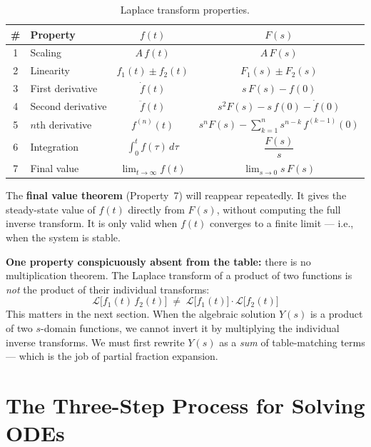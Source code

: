 \documentclass[12pt]{article}
\begin{document}
\begin{table}[htbp]
\centering
\caption{Laplace transform properties.}
\label{tab:theorems}
\begin{tabular}{clcc}
\toprule
\# & Property & $f(t)$ & $F(s)$ \\
\midrule
1 & Scaling      & $A\,f(t)$            & $A\,F(s)$ \\[4pt]
2 & Linearity    & $f_1(t) \pm f_2(t)$  & $F_1(s) \pm F_2(s)$ \\[4pt]
3 & First derivative  & $\dot{f}(t)$   & $s\,F(s) - f(0)$ \\[4pt]
4 & Second derivative & $\ddot{f}(t)$  & $s^2 F(s) - s\,f(0) - \dot{f}(0)$ \\[6pt]
5 & $n$th derivative  & $f^{(n)}(t)$   & $\displaystyle s^n F(s)
    - \sum_{k=1}^{n} s^{n-k}\, f^{(k-1)}(0)$ \\[8pt]
6 & Integration  & $\displaystyle\int_0^t f(\tau)\,d\tau$
                                        & $\dfrac{F(s)}{s}$ \\[8pt]
7 & Final value  & $\displaystyle\lim_{t\to\infty} f(t)$
                                        & $\displaystyle\lim_{s\to 0} s\,F(s)$ \\[4pt]
\bottomrule
\end{tabular}
\end{table}

The \textbf{final value theorem} (Property~7) will reappear repeatedly.  It
gives the steady-state value of $f(t)$ directly from $F(s)$, without computing
the full inverse transform.  It is only valid when $f(t)$ converges to a finite
limit --- i.e., when the system is stable.

\textbf{One property conspicuously absent from the table:} there is no
multiplication theorem.  The Laplace transform of a product of two functions is
\emph{not} the product of their individual transforms:
\begin{equation}
  \mathcal{L}\bigl[f_1(t)\,f_2(t)\bigr] \;\neq\; \mathcal{L}\bigl[f_1(t)\bigr]
  \cdot \mathcal{L}\bigl[f_2(t)\bigr]
  \label{eq:no_product}
\end{equation}
This matters in the next section.  When the algebraic solution $Y(s)$ is a
product of two $s$-domain functions, we cannot invert it by multiplying the
individual inverse transforms.  We must first rewrite $Y(s)$ as a \emph{sum}
of table-matching terms --- which is the job of partial fraction expansion.

\section{The Three-Step Process for Solving ODEs}
\label{sec:threestep}
\end{document}
